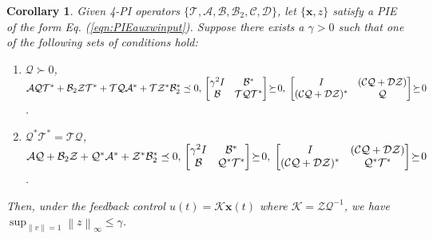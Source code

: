 \documentclass[letterpaper, 10 pt, conference]{ieeeconf}
\newcommand{\mcl}[1]{\mathcal{#1}}
\newcommand{\mbf}[1]{\mathbf{#1}}
\newcommand{\norm}[1]{\left\lVert #1 \right\rVert}
\newcommand{\bmat}[1]{\begin{bmatrix} #1 \end{bmatrix}}
\newtheorem{corollary}{Corollary}
\theoremstyle{definition}
\begin{document}
\begin{corollary}\label{cor:control}
    Given 4-PI operators $\{\mathcal{T}, \mathcal{A},\mathcal{B}, \mcl B_2,\mathcal{C}, \mcl D\}$, let $\{\mbf x, z\}$ satisfy a PIE of the form Eq. (\ref{eqn:PIEauxwinput}).
    Suppose there exists a $\gamma > 0$
    such that one of the following sets of conditions hold:
    \begin{enumerate}[leftmargin=6mm]
        \item[(i)] $\mcl Q\succ 0$, $\mcl A\mcl Q \mcl T^*+\mcl B_2 \mcl Z \mcl T^* + \mcl T \mcl Q\mcl A^* + \mcl T \mcl Z^* \mcl B_2^* \preceq 0,\vspace{1mm}\\  \begin{bmatrix}
            \gamma^2I&  \mcl B^*\\ \mcl B & \mcl T\mcl Q\mcl T^*
        \end{bmatrix}\!\succeq\! 0,\;\bmat{I & (\mcl C\mcl Q+\mcl D\mcl Z)\\(\mcl C\mcl Q+\mcl D\mcl Z)^*& \mcl Q}\!\succeq\! 0$. \vspace{3mm}
       
        \item[(ii)] $\mcl Q^*\mcl T^*=\mcl T\mcl Q$, $\mcl A \mcl Q +\mcl B_2 \mcl Z +\mcl Q^* \mcl A^* + \mcl Z^* \mcl B_2^* \preceq 0,\vspace{1mm}\\ \begin{bmatrix}
            \gamma^2I & \mcl B^*\\ \mcl B & \mcl Q^* \mcl  T^* 
        \end{bmatrix}\!\succeq\! 0, \;\begin{bmatrix}
            I & (\mcl C\mcl Q+\mcl D\mcl Z)\\  (\mcl C\mcl Q+\mcl D\mcl Z)^*& \mcl Q^*\mcl T^*
        \end{bmatrix}\!\succeq\! 0$. 
    \end{enumerate}
    Then, under the feedback control $u(t)=\mcl K\mbf x(t)$ where $\mcl K= \mcl Z\mcl Q^{-1}$, we have $\sup_{\norm{v}=1} \norm{z}_\infty \le \gamma$.
\end{corollary}
\end{document}
